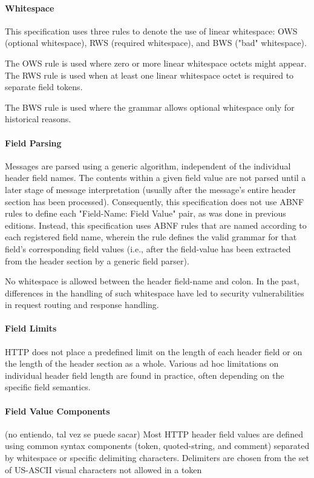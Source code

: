 \paragraph{Whitespace}
This specification uses three rules to denote the use of linear
whitespace: OWS (optional whitespace), RWS (required whitespace), and
BWS ("bad" whitespace).

The OWS rule is used where zero or more linear whitespace octets
might appear.  
The RWS rule is used when at least one linear whitespace octet is
required to separate field tokens.  

The BWS rule is used where the grammar allows optional whitespace
only for historical reasons. 

\paragraph{Field Parsing}
Messages are parsed using a generic algorithm, independent of the
individual header field names.  The contents within a given field
value are not parsed until a later stage of message interpretation
(usually after the message's entire header section has been
processed).  Consequently, this specification does not use ABNF rules
to define each "Field-Name: Field Value" pair, as was done in
previous editions.  Instead, this specification uses ABNF rules that
are named according to each registered field name, wherein the rule
defines the valid grammar for that field's corresponding field values
(i.e., after the field-value has been extracted from the header
section by a generic field parser).

No whitespace is allowed between the header field-name and colon.  In
the past, differences in the handling of such whitespace have led to
security vulnerabilities in request routing and response handling. 


\paragraph{Field Limits }
HTTP does not place a predefined limit on the length of each header
field or on the length of the header section as a whole.  Various 
ad hoc limitations on individual header
field length are found in practice, often depending on the specific
field semantics.


\paragraph{Field Value Components}
(no entiendo, tal vez se puede sacar)
Most HTTP header field values are defined using common syntax
components (token, quoted-string, and comment) separated by
whitespace or specific delimiting characters.  Delimiters are chosen
from the set of US-ASCII visual characters not allowed in a token

